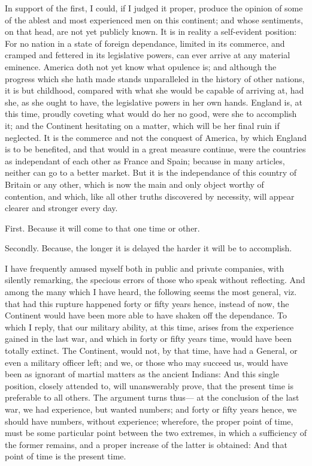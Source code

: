 \documentclass[12pt,oneside]{memoir}
\begin{document}
In support of the first, I could, if I judged it proper, produce the
opinion of some of the ablest and most experienced men on this
continent; and whose sentiments, on that head, are not yet publicly
known. It is in reality a self-evident position: For no nation in a
state of foreign dependance, limited in its commerce, and cramped
and fettered in its legislative powers, can ever arrive at any
material eminence. America doth not yet know what opulence is; and
although the progress which she hath made stands unparalleled in the
history of other nations, it is but childhood, compared with what
she would be capable of arriving at, had she, as she ought to have,
the legislative powers in her own hands. England is, at this time,
proudly coveting what would do her no good, were she to accomplish
it; and the Continent hesitating on a matter, which will be her
final ruin if neglected. It is the commerce and not the conquest of
America, by which England is to be benefited, and that would in a
great measure continue, were the countries as independant of each
other as France and Spain; because in many articles, neither can go
to a better market. But it is the independance of this country of
Britain or any other, which is now the main and only object worthy
of contention, and which, like all other truths discovered by
necessity, will appear clearer and stronger every day.

First. Because it will come to that one time or other.

Secondly. Because, the longer it is delayed the harder it will be to
accomplish.

I have frequently amused myself both in public and private companies,
with silently remarking, the specious errors of those who speak
without reflecting. And among the many which I have heard, the
following seems the most general, viz. that had this rupture
happened forty or fifty years hence, instead of now, the Continent
would have been more able to have shaken off the dependance. To
which I reply, that our military ability, at this time, arises from
the experience gained in the last war, and which in forty or fifty
years time, would have been totally extinct. The Continent, would
not, by that time, have had a General, or even a military officer
left; and we, or those who may succeed us, would have been as
ignorant of martial matters as the ancient Indians: And this single
position, closely attended to, will unanswerably prove, that the
present time is preferable to all others. The argument turns thus---
at the conclusion of the last war, we had experience, but wanted
numbers; and forty or fifty years hence, we should have numbers,
without experience; wherefore, the proper point of time, must be
some particular point between the two extremes, in which a
sufficiency of the former remains, and a proper increase of the
latter is obtained: And that point of time is the present time.
\end{document}
